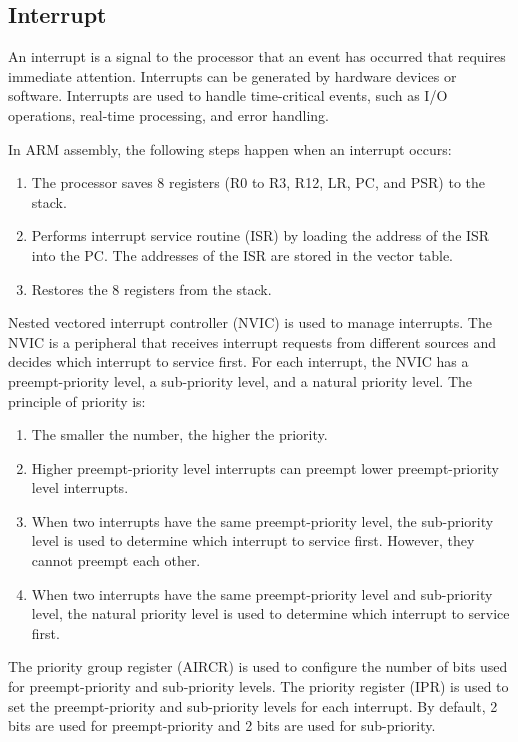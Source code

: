 \documentclass[a4paper,12pt]{article}
\begin{document}
\subsection{Interrupt}

An interrupt is a signal to the processor that an event has occurred that requires immediate attention. Interrupts can be generated by hardware devices or software. Interrupts are used to handle time-critical events, such as I/O operations, real-time processing, and error handling.

In ARM assembly, the following steps happen when an interrupt occurs:
\begin{enumerate}
	\item The processor saves 8 registers (R0 to R3, R12, LR, PC, and PSR) to the stack.
	\item Performs interrupt service routine (ISR) by loading the address of the ISR into the PC. The addresses of the ISR are stored in the vector table.
	\item Restores the 8 registers from the stack.
\end{enumerate}

Nested vectored interrupt controller (NVIC) is used to manage interrupts. The NVIC is a peripheral that receives interrupt requests from different sources and decides which interrupt to service first. For each interrupt, the NVIC has a preempt-priority level, a sub-priority level, and a natural priority level. The principle of priority is:
\begin{enumerate}
	\item The smaller the number, the higher the priority.
	\item Higher preempt-priority level interrupts can preempt lower preempt-priority level interrupts.
	\item When two interrupts have the same preempt-priority level, the sub-priority level is used to determine which interrupt to service first. However, they cannot preempt each other.
	\item When two interrupts have the same preempt-priority level and sub-priority level, the natural priority level is used to determine which interrupt to service first.
\end{enumerate}

The priority group register (AIRCR) is used to configure the number of bits used for preempt-priority and sub-priority levels. The priority register (IPR) is used to set the preempt-priority and sub-priority levels for each interrupt. By default, 2 bits are used for preempt-priority and 2 bits are used for sub-priority.
\end{document}
